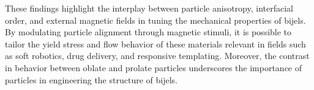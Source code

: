 These findings highlight the interplay between particle anisotropy, interfacial order, and external magnetic fields in tuning the mechanical properties of bijels. 
By modulating particle alignment through magnetic stimuli, it is possible to tailor the yield stress and flow behavior of these materials relevant in fields such as soft 
robotics, drug delivery, and responsive templating. Moreover, the contrast in behavior between oblate and prolate particles 
underscores the importance of particles in engineering the structure of bijels.